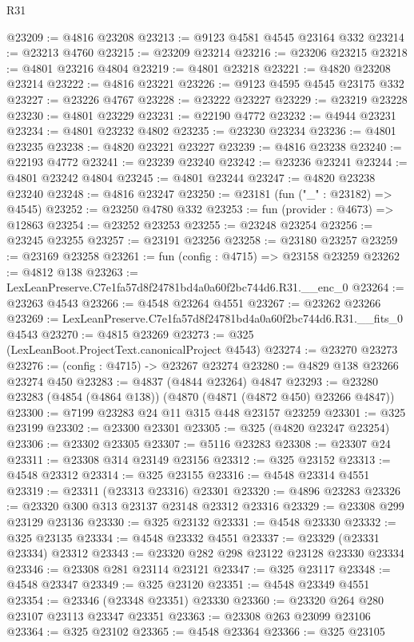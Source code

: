 \begin{lexlean}{R31}
\begin{coremodule}
@23209 := @4816 @23208
@23213 := @9123 @4581 @4545 @23164 @332
@23214 := @23213 @4760
@23215 := @23209 @23214
@23216 := @23206 @23215
@23218 := @4801 @23216 @4804
@23219 := @4801 @23218
@23221 := @4820 @23208 @23214
@23222 := @4816 @23221
@23226 := @9123 @4595 @4545 @23175 @332
@23227 := @23226 @4767
@23228 := @23222 @23227
@23229 := @23219 @23228
@23230 := @4801 @23229
@23231 := @22190 @4772
@23232 := @4944 @23231
@23234 := @4801 @23232 @4802
@23235 := @23230 @23234
@23236 := @4801 @23235
@23238 := @4820 @23221 @23227
@23239 := @4816 @23238
@23240 := @22193 @4772
@23241 := @23239 @23240
@23242 := @23236 @23241
@23244 := @4801 @23242 @4804
@23245 := @4801 @23244
@23247 := @4820 @23238 @23240
@23248 := @4816 @23247
@23250 := @23181 (fun ("_" : @23182) => @4545)
@23252 := @23250 @4780 @332
@23253 := fun (provider : @4673) => @12863
@23254 := @23252 @23253
@23255 := @23248 @23254
@23256 := @23245 @23255
@23257 := @23191 @23256
@23258 := @23180 @23257
@23259 := @23169 @23258
@23261 := fun (config : @4715) => @23158 @23259
@23262 := @4812 @138
@23263 := LexLeanPreserve.C7e1fa57d8f24781bd4a0a60f2bc744d6.R31.__enc_0
@23264 := @23263 @4543
@23266 := @4548 @23264 @4551
@23267 := @23262 @23266
@23269 := LexLeanPreserve.C7e1fa57d8f24781bd4a0a60f2bc744d6.R31.__fits_0 @4543
@23270 := @4815 @23269
@23273 := @325 (LexLeanBoot.ProjectText.canonicalProject @4543)
@23274 := @23270 @23273
@23276 := (config : @4715) -> @23267 @23274
@23280 := @4829 @138 @23266 @23274 @450
@23283 := @4837 (@4844 @23264) @4847
@23293 := @23280 @23283 (@4854 (@4864 @138)) (@4870 (@4871 (@4872 @450) @23266 @4847))
@23300 := @7199 @23283 @24 @11 @315 @448 @23157 @23259
@23301 := @325 @23199
@23302 := @23300 @23301
@23305 := @325 (@4820 @23247 @23254)
@23306 := @23302 @23305
@23307 := @5116 @23283
@23308 := @23307 @24
@23311 := @23308 @314 @23149 @23156
@23312 := @325 @23152
@23313 := @4548 @23312
@23314 := @325 @23155
@23316 := @4548 @23314 @4551
@23319 := @23311 (@23313 @23316) @23301
@23320 := @4896 @23283
@23326 := @23320 @300 @313 @23137 @23148 @23312 @23316
@23329 := @23308 @299 @23129 @23136
@23330 := @325 @23132
@23331 := @4548 @23330
@23332 := @325 @23135
@23334 := @4548 @23332 @4551
@23337 := @23329 (@23331 @23334) @23312
@23343 := @23320 @282 @298 @23122 @23128 @23330 @23334
@23346 := @23308 @281 @23114 @23121
@23347 := @325 @23117
@23348 := @4548 @23347
@23349 := @325 @23120
@23351 := @4548 @23349 @4551
@23354 := @23346 (@23348 @23351) @23330
@23360 := @23320 @264 @280 @23107 @23113 @23347 @23351
@23363 := @23308 @263 @23099 @23106
@23364 := @325 @23102
@23365 := @4548 @23364
@23366 := @325 @23105

\end{coremodule}
\end{lexlean}

